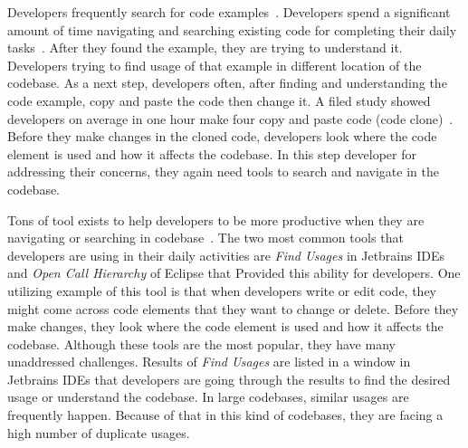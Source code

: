 \documentclass[conference]{IEEEtran}
\begin{document}
Developers frequently search for code examples~\cite{brandt2009two,sadowski2015developers}. Developers spend a significant amount of time navigating and searching existing code for completing their daily tasks~\cite{piorkowski2016foraging,ko2006exploratory}. After they found the example, they are trying to understand it. Developers trying to find usage of that example in different location of the codebase. As a next step, developers often, after finding and understanding the code example, copy and paste the code then change it. A filed study showed developers on average in one hour make four copy and paste code (code clone)~\cite{kim2004ethnographic}. Before they make changes in the cloned code, developers look where the code element is used and how it affects the codebase. In this step developer for addressing their concerns, they again need tools to search and navigate in the codebase.\par


Tons of tool exists to help developers to be more productive when they are navigating or searching in codebase~\cite{augustine2015field,ko2006exploratory,albusays2017interviews}. The two most common tools that developers are using in their daily activities are \textit{Find Usages} in Jetbrains IDEs and \textit{Open Call Hierarchy} of Eclipse that Provided this ability for developers. One utilizing example of this tool is that when developers write or edit code, they might come across code elements that they want to change or delete. Before they make changes, they look where the code element is used and how it affects the codebase. Although these tools are the most popular, they have many unaddressed challenges. Results of \textit{Find Usages} are listed in a window in Jetbrains IDEs that developers are going through the results to find the desired usage or understand the codebase. In large codebases, similar usages are frequently happen. Because of that in this kind of codebases, they are facing a high number of duplicate usages.\par

\end{document}
